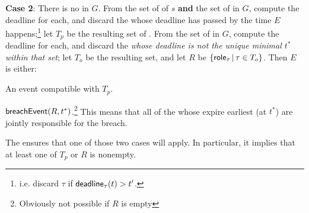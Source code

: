 \documentclass[12pt]{article}
\begin{document}
{\bf Case 2}: There is no \enabled \mustntran in $G$. From the set of \enabled \mayntrans of $s$ {\bf and} the set of \enabled \rmustntrans in $G$, compute the deadline for each, and discard the \transitions whose deadline has passed by the time $E$ happens;\footnote{i.e. discard $\tau$ if $\textsf{deadline}_{\tau}(t) > t'$.}  let $T_p$ be the resulting set of \transitions. From the set of \enabled \rmustntrans in $G$, compute the deadline for each, and discard the {\transitions} {\it whose deadline is not the unique minimal \TimeStamp $t^*$ within that set}; let $T_o$ be the resulting set, and let $R$ be $\{ \textsf{role}_{\tau} \, \vert \, \tau \in T_{o} \}$. Then $E$ is either:
\begin{PPI}
	\item An event compatible with $T_p$.
	\item $\textsf{breachEvent}(R,t^*)$.\footnote{Obviously not possible if $R$ is empty} This means that all of the \Roles whose \enabled \rmustntran expire earliest (at $t^*$) are jointly responsible for the breach.
\end{PPI}	
The \bostgc ensures that one of those two cases will apply. In particular, it implies that at least one of $T_p$ or $R$ is nonempty.

\end{document}

